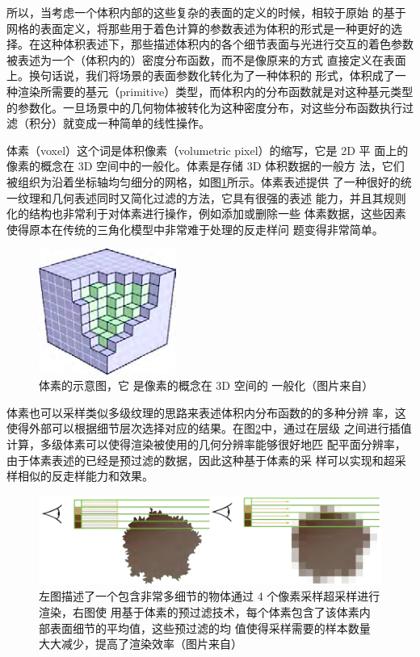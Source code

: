所以，当考虑一个体积内部的这些复杂的表面的定义的时候，相较于原始 的基于网格的表面定义，将那些用于着色计算的参数表述为体积的形式是一种更好的选择。在这种体积表述下，那些描述体积内的各个细节表面与光进行交互的着色参数被表述为一个（体积内的）密度分布函数，而不是像原来的方式 直接定义在表面上。换句话说，我们将场景的表面参数化转化为了一种体积的 形式，体积成了一种渲染所需要的基元（primitive）类型，而体积内的分布函数就是对这种基元类型的参数化。一旦场景中的几何物体被转化为这种密度分布，对这些分布函数执行过滤（积分）就变成一种简单的线性操作。

体素（voxel）这个词是体积像素（volumetric pixel）的缩写，它是 2D 平 面上的像素的概念在 3D 空间中的一般化。体素是存储 3D 体积数据的一般方 法，它们被组织为沿着坐标轴均匀细分的网格，如图\ref{f:vct-4-2}所示。体素表述提供 了一种很好的统一纹理和几何表述同时又简化过滤的方法，它具有很强的表述 能力，并且其规则化的结构也非常利于对体素进行操作，例如添加或删除一些 体素数据，这些因素使得原本在传统的三角化模型中非常难于处理的反走样问 题变得非常简单。

\begin{figure}
\sidecaption
	\includegraphics[width=0.4\textwidth]{figures/vct/vct-4-2}
	\caption{体素的示意图，它 是像素的概念在 3D 空间的 一般化（图片来自\cite{a:InteractiveIndirectIlluminationUsingVoxelConeTracing}）}
	\label{f:vct-4-2}
\end{figure}

体素也可以采样类似多级纹理的思路来表述体积内分布函数的的多种分辨 率，这使得外部可以根据细节层次选择对应的结果。在图\ref{f:vct-4-3}中，通过在层级 之间进行插值计算，多级体素可以使得渲染被使用的几何分辨率能够很好地匹 配平面分辨率，由于体素表述的已经是预过滤的数据，因此这种基于体素的采 样可以实现和超采样相似的反走样能力和效果。

\begin{figure}
	\includegraphics[width=\textwidth]{figures/vct/vct-4-3}
	\caption{左图描述了一个包含非常多细节的物体通过 4 个像素采样超采样进行渲染，右图使 用基于体素的预过滤技术，每个体素包含了该体素内部表面细节的平均值，这些预过滤的均 值使得采样需要的样本数量大大减少，提高了渲染效率（图片来自\cite{a:InteractiveIndirectIlluminationUsingVoxelConeTracing}）}
	\label{f:vct-4-3}
\end{figure}



